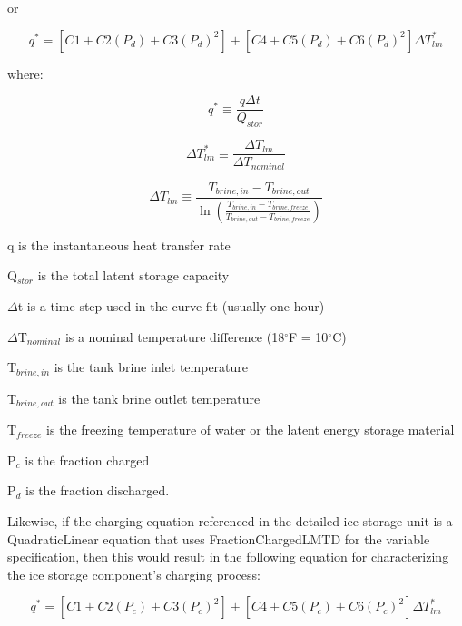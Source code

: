 or

\begin{equation}
{q^*} = \left[ {C1 + C2\left( {{P_d}} \right) + C3{{\left( {{P_d}} \right)}^2}} \right] + \left[ {C4 + C5\left( {{P_d}} \right) + C6{{\left( {{P_d}} \right)}^2}} \right]\Delta T_{lm}^*
\end{equation}

where:

\begin{equation}
{q^*} \equiv \frac{{q\Delta t}}{{{Q_{stor}}}}
\end{equation}

\begin{equation}
\Delta T_{lm}^* \equiv \frac{{\Delta {T_{lm}}}}{{\Delta {T_{nominal}}}}
\end{equation}

\begin{equation}
\Delta {T_{lm}} \equiv \frac{{{T_{brine,in}} - {T_{brine,out}}}}{{\ln \left( {\frac{{{T_{brine,in}} - {T_{brine,freeze}}}}{{{T_{brine,out}} - {T_{brine,freeze}}}}} \right)}}
\end{equation}

q is the instantaneous heat transfer rate

Q\(_{stor}\) is the total latent storage capacity

\(\Delta\)t is a time step used in the curve fit (usually one hour)

\(\Delta\)T\(_{nominal}\) is a nominal temperature difference (18\(^{\circ}\)F = 10\(^{\circ}\)C)

T\(_{brine,in}\) is the tank brine inlet temperature

T\(_{brine,out}\) is the tank brine outlet temperature

T\(_{freeze}\) is the freezing temperature of water or the latent energy storage material

P\(_{c}\) is the fraction charged

P\(_{d}\) is the fraction discharged.

Likewise, if the charging equation referenced in the detailed ice storage unit is a QuadraticLinear equation that uses FractionChargedLMTD for the variable specification, then this would result in the following equation for characterizing the ice storage component's charging process:

\begin{equation}
{q^*} = \left[ {C1 + C2\left( {{P_c}} \right) + C3{{\left( {{P_c}} \right)}^2}} \right] + \left[ {C4 + C5\left( {{P_c}} \right) + C6{{\left( {{P_c}} \right)}^2}} \right]\Delta T_{lm}^*
\end{equation}

